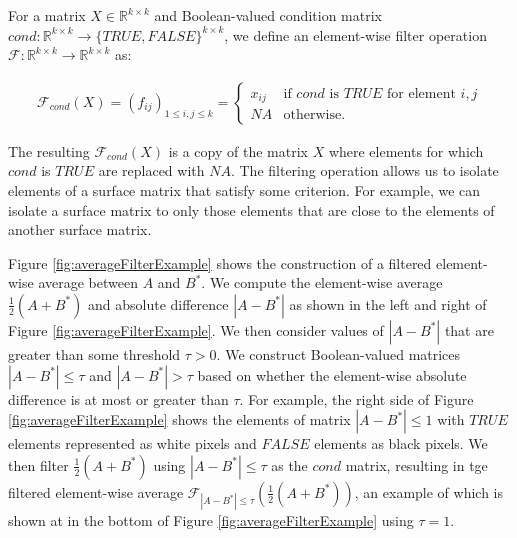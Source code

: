 \documentclass[11pt,]{isuthesis}
\begin{document}
For a matrix \(X \in \mathbb{R}^{k \times k}\) and Boolean-valued condition matrix \(cond: \mathbb{R}^{k \times k} \to \{TRUE,FALSE\}^{k \times k}\), we define an element-wise filter operation \(\mathcal{F}: \mathbb{R}^{k \times k} \to \mathbb{R}^{k \times k}\) as:

\begin{align*}
\mathcal{F}_{cond}(X) =
(f_{ij})_{1 \leq i,j \leq k} =
\begin{cases}
x_{ij} &\text{if $cond$ is $TRUE$ for element $i,j$} \\
NA &\text{otherwise.}
\end{cases}
\end{align*}

The resulting \(\mathcal{F}_{cond}(X)\) is a copy of the matrix \(X\) where elements for which \(cond\) is \(TRUE\) are replaced with \(NA\).
The filtering operation allows us to isolate elements of a surface matrix that satisfy some criterion.
For example, we can isolate a surface matrix to only those elements that are close to the elements of another surface matrix.

Figure \ref{fig:averageFilterExample} shows the construction of a filtered element-wise average between \(A\) and \(B^*\).
We compute the element-wise average \(\frac{1}{2}(A + B^*)\) and absolute difference \(|A - B^*|\) as shown in the left and right of Figure \ref{fig:averageFilterExample}.
We then consider values of \(|A - B^*|\) that are greater than some threshold \(\tau > 0\).
We construct Boolean-valued matrices \(|A - B^*| \leq \tau\) and \(|A - B^*| > \tau\) based on whether the element-wise absolute difference is at most or greater than \(\tau\).
For example, the right side of Figure \ref{fig:averageFilterExample} shows the elements of matrix \(|A - B^*| \leq 1\) with \(TRUE\) elements represented as white pixels and \(FALSE\) elements as black pixels.
We then filter \(\frac{1}{2}(A + B^*)\) using \(|A - B^*| \leq \tau\) as the \(cond\) matrix, resulting in tge filtered element-wise average \(\mathcal{F}_{|A - B^*| \leq \tau}\left(\frac{1}{2}(A + B^*)\right)\), an example of which is shown at in the bottom of Figure \ref{fig:averageFilterExample} using \(\tau = 1\).
\end{document}
